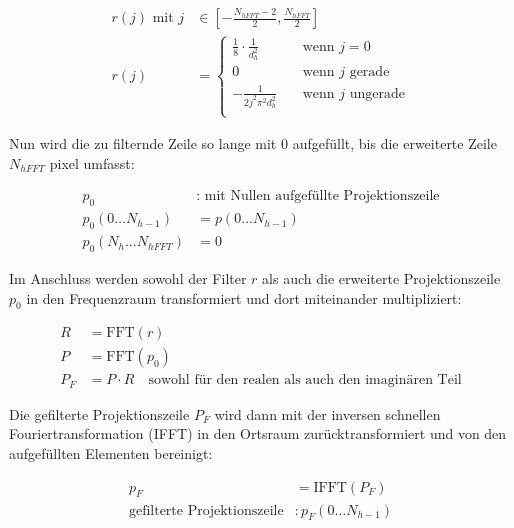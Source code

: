 \begin{equation}\label{eq:filter_gen}
    \begin{aligned}
        r(j) \text{ mit } j &\in \left[-\frac{N_{hFFT} - 2}{2}, \frac{N_{hFFT}}{2}\right]\\
        r(j) &=
            \begin{cases}
                \frac{1}{8} \cdot \frac{1}{d_h^2} & \quad \text{wenn } j = 0\\
                0 & \quad \text{wenn } j \text{ gerade}\\
                -\frac{1}{2j^2\pi^2d_h^2} & \quad \text{wenn } j \text{ ungerade}\\
            \end{cases}
    \end{aligned}
\end{equation}

Nun wird die zu filternde Zeile so lange mit $0$ aufgefüllt, bis die erweiterte Zeile $N_{hFFT}$ \gls{pixel} umfasst:

\begin{equation}
    \begin{aligned}
        p_0 &: \text{ mit Nullen aufgefüllte Projektionszeile}\\
        p_0(0 \dots N_{h - 1}) &= p(0 \dots N_{h - 1})\\
        p_0(N_{h} \dots N_{hFFT}) &= 0
    \end{aligned}
\end{equation}

Im Anschluss werden sowohl der Filter $r$ als auch die erweiterte Projektionszeile $p_0$ in den Frequenzraum
transformiert und dort miteinander multipliziert:

\begin{equation}
    \begin{aligned}
        R &= \text{FFT}(r)\\
        P &= \text{FFT}(p_0)\\
        P_F &= P \cdot R \quad \text{sowohl für den realen als auch den imaginären Teil}
    \end{aligned}
\end{equation}

Die gefilterte Projektionszeile $P_F$ wird dann mit der inversen schnellen Fouriertransformation (IFFT) in den Ortsraum
zurücktransformiert und von den {\glqq}aufgefüllten{\grqq} Elementen bereinigt:

\begin{equation}
    \begin{aligned}
        p_F &= \text{IFFT}(P_F)\\
        \text{gefilterte Projektionszeile} &: p_F(0 \dots N_{h - 1})
    \end{aligned}
\end{equation}

